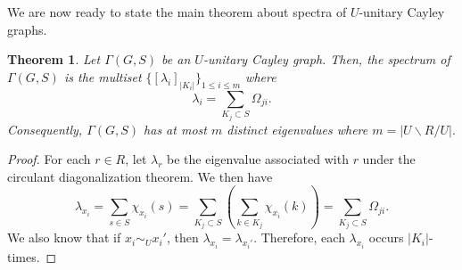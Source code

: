 \documentclass[12pt, a4paper]{amsart}
\newtheorem{thm}{Theorem}[section]
\theoremstyle{definition}
\numberwithin{equation}{section}
\begin{document}
We are now ready to state the main theorem about spectra of $U$-unitary Cayley graphs. 
\begin{thm} \label{prop:eigenvalues}
Let $\Gamma(G,S)$ be an $U$-unitary Cayley graph. Then,  the spectrum of $\Gamma(G,S)$ is the multiset $\{[\lambda_i]_{|K_i|} \}_{1 \leq i \leq m}$ where 
    \[\lambda_i = \sum_{K_j \subset S} \Omega_{ji}.\]
    Consequently, $\Gamma(G,S)$ has at most $m$ distinct eigenvalues where $m=|U \backslash R \slash U|.$
\end{thm}
\begin{proof}
    For each $r \in R$, let $\lambda_r$ be the eigenvalue associated with $r$ under the circulant diagonalization theorem. We then have 
    \[ \lambda_{x_i} = \sum_{s \in S} \chi_{x_i}(s) = \sum_{K_j \subset S} \left(\sum_{k \in K_j} \chi_{x_i}(k)\right) = \sum_{K_j \subset S} \Omega_{ji}. \]
    We also know that if $x_i \sim_{U} x_i'$, then $\lambda_{x_i}=\lambda_{x_i'}.$ Therefore, each $\lambda_{x_i}$ occurs $|K_i|$-times. 
\end{proof}
\end{document}
